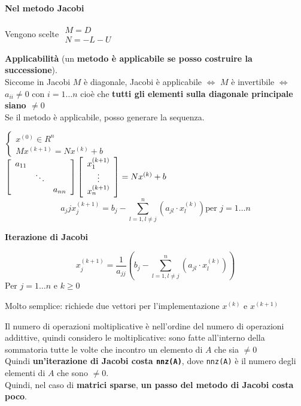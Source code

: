 \documentclass[10pt]{book}
\begin{document}
\paragraph{Nel metodo Jacobi} Vengono scelte $\begin{array}{l}
M = D\\N = -L-U
\end{array}$
\begin{list}{}{}
	\item \textbf{Applicabilità} (un \textbf{metodo è applicabile se posso costruire la successione}).\\
	Siccome in Jacobi $M$ è diagonale, Jacobi è applicabile $\Leftrightarrow$ $M$ è invertibile $\Leftrightarrow$ $a_{ii} \neq 0$ con $i = 1\ldots n$ cioè che \textbf{tutti gli elementi sulla diagonale principale siano $\neq 0$}\\
	Se il metodo è applicabile, posso generare la sequenza.
	\begin{multicols}{2}	
	$\left\{\begin{array}{l}
	x^{(0)} \in R^n\\
	Mx^{(k+1)} = Nx^{(k)} + b
	\end{array}\right.$\\
	$\left[ \begin{array}{c c c}
	a_{11}\\
	& \ddots\\
	& & a_{nn}
	\end{array}\right] \left[ \begin{array}{c}
	x_1^{(k+1)}\\\vdots\\x_n^{(k+1)}
	\end{array} \right] = Nx^{(k)} + b$
	$$a_jj x_j^{(k+1)} = b_j - \sum_{l = 1, l\neq j}^n \left(a_{jl}\cdot x^{(k)}_l\right)\text{per }j = 1\ldots n$$
	\columnbreak
	\begin{center}
		\textbf{Iterazione di Jacobi}	
	\end{center}
	$$x_j^{(k+1)} = \frac{1}{a_{jj}} \left(b_j - \sum_{l = 1, l\neq j}^n \left(a_{jl}\cdot x^{(k)}_l\right)\right)$$
	Per $j = 1\ldots n$ e $k \geq 0$
	\end{multicols}
	\item Molto semplice: richiede due vettori per l'implementazione $x^{(k)}$ e $x^{(k+1)}$
	\item Il numero di operazioni moltiplicative è nell'ordine del numero di operazioni addittive, quindi considero le moltiplicative: sono fatte all'interno della sommatoria tutte le volte che incontro un elemento di $A$ che sia $\neq 0$\\
	Quindi \textbf{un'iterazione di Jacobi costa \texttt{nnz(A)}}, dove \texttt{nnz(A)} è il numero degli elementi di $A$ che sono $\neq 0$.\\
	Quindi, nel caso di \textbf{matrici sparse}, \textbf{un passo del metodo di Jacobi costa poco}.
\end{list}
\end{document}

